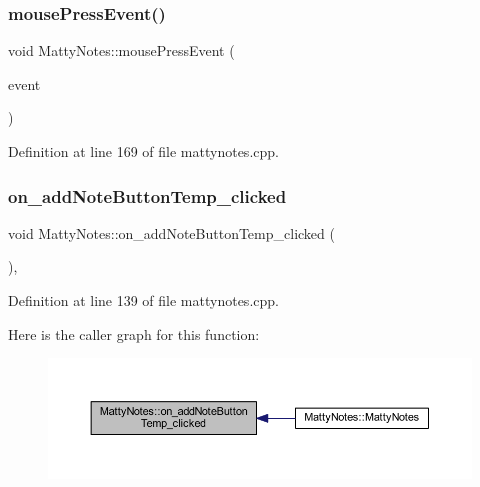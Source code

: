 \subsubsection{\texorpdfstring{mouse\+Press\+Event()}{mousePressEvent()}}
{\footnotesize\ttfamily void Matty\+Notes\+::mouse\+Press\+Event (\begin{DoxyParamCaption}\item[{Q\+Mouse\+Event $\ast$}]{event }\end{DoxyParamCaption})\hspace{0.3cm}{\ttfamily [private]}}



Definition at line 169 of file mattynotes.\+cpp.

\hypertarget{classMattyNotes_a03ee529c5492bc8d73a8a93ecc32c394}{}\label{classMattyNotes_a03ee529c5492bc8d73a8a93ecc32c394} 
\subsubsection{\texorpdfstring{on\+\_\+add\+Note\+Button\+Temp\+\_\+clicked}{on\_addNoteButtonTemp\_clicked}}
{\footnotesize\ttfamily void Matty\+Notes\+::on\+\_\+add\+Note\+Button\+Temp\+\_\+clicked (\begin{DoxyParamCaption}{ }\end{DoxyParamCaption})\hspace{0.3cm}{\ttfamily [private]}, {\ttfamily [slot]}}



Definition at line 139 of file mattynotes.\+cpp.

Here is the caller graph for this function\+:
\nopagebreak
\begin{figure}[H]
\begin{center}
\leavevmode
\includegraphics[width=350pt]{classMattyNotes_a03ee529c5492bc8d73a8a93ecc32c394_icgraph}
\end{center}
\end{figure}


